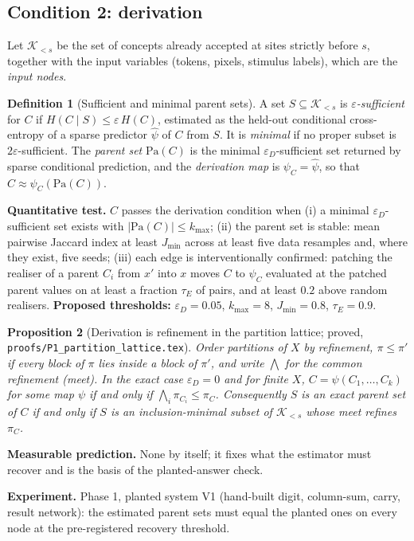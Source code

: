 \documentclass[11pt]{article}
\theoremstyle{definition}
\newtheorem{definition}{Definition}[section]
\theoremstyle{plain}
\newtheorem{proposition}[definition]{Proposition}
\theoremstyle{remark}
\newcommand{\pa}{\mathrm{Pa}}
\newcommand{\Hent}{H}
\newcommand{\Part}{\pi}
\newcommand{\predict}[1]{\par\noindent\textbf{Measurable prediction.} #1}
\newcommand{\experiment}[1]{\par\noindent\textbf{Experiment.} #1\par\medskip}
\begin{document}
\subsection{Condition 2: derivation}

Let $\mathcal{K}_{<s}$ be the set of concepts already accepted at sites
strictly before $s$, together with the input variables (tokens, pixels,
stimulus labels), which are the \emph{input nodes}.

\begin{definition}[Sufficient and minimal parent sets]\label{def:parents}
A set $S\subseteq\mathcal{K}_{<s}$ is \emph{$\varepsilon$-sufficient} for $C$
if $\Hent(C\mid S)\le\varepsilon\,\Hent(C)$, estimated as the held-out
conditional cross-entropy of a sparse predictor $\hat\psi$ of $C$ from $S$.
It is \emph{minimal} if no proper subset is $2\varepsilon$-sufficient. The
\emph{parent set} $\pa(C)$ is the minimal $\varepsilon_D$-sufficient set
returned by sparse conditional prediction, and the \emph{derivation map} is
$\psi_C=\hat\psi$, so that $C\approx\psi_C(\pa(C))$.
\end{definition}

\noindent\textbf{Quantitative test.} $C$ passes the derivation condition when
(i) a minimal $\varepsilon_D$-sufficient set exists with $|\pa(C)|\le k_{\max}$;
(ii) the parent set is stable: mean pairwise Jaccard index at least $J_{\min}$
across at least five data resamples and, where they exist, five seeds;
(iii) each edge is interventionally confirmed: patching the realiser of a
parent $C_i$ from $x'$ into $x$ moves $C$ to $\psi_C$ evaluated at the patched
parent values on at least a fraction $\tau_E$ of pairs, and at least $0.2$
above random realisers.
\textbf{Proposed thresholds:} $\varepsilon_D=0.05$, $k_{\max}=8$,
$J_{\min}=0.8$, $\tau_E=0.9$.

\begin{proposition}[Derivation is refinement in the partition lattice;
proved, \texttt{proofs/P1\_partition\_lattice.tex}]\label{prop:lattice}
Order partitions of $X$ by refinement, $\Part\le\Part'$ if every block of
$\Part$ lies inside a block of $\Part'$, and write $\bigwedge$ for the common
refinement (meet). In the exact case $\varepsilon_D=0$ and for finite $X$,
$C=\psi(C_1,\dots,C_k)$ for some map $\psi$ if and only if
$\bigwedge_{i}\Part_{C_i}\le\Part_C$. Consequently $S$ is an exact parent set
of $C$ if and only if $S$ is an inclusion-minimal subset of
$\mathcal{K}_{<s}$ whose meet refines $\Part_C$.
\end{proposition}
\predict{None by itself; it fixes what the estimator must recover and is the
basis of the planted-answer check.}
\experiment{Phase 1, planted system V1 (hand-built digit, column-sum, carry,
result network): the estimated parent sets must equal the planted ones on
every node at the pre-registered recovery threshold.}
\end{document}
